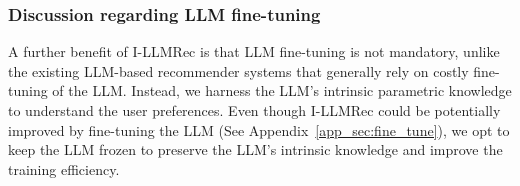 \documentclass[sigconf]{acmart}
\newcommand{\proposed}{\textsf{I-LLMRec}}
\begin{document}
\smallskip
\subsubsection{\textbf{Discussion regarding LLM fine-tuning}}
A further benefit of \proposed{} is that LLM fine-tuning is not mandatory, unlike the existing LLM-based recommender systems \cite{lin2024bridging,bao2023tallrec,tan2024idgenrec,zheng2024harnessing,liu2024once} that generally rely on costly fine-tuning of the LLM. Instead, we harness the LLM's intrinsic parametric knowledge to understand the user preferences. Even though \proposed{} could be potentially improved by fine-tuning the LLM (See Appendix~\ref{app_sec:fine_tune}), we opt to keep the LLM frozen to preserve the LLM's intrinsic knowledge and improve the training efficiency.


\end{document}
